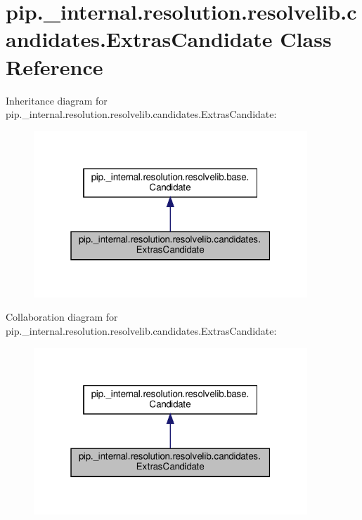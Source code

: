 \hypertarget{classpip_1_1__internal_1_1resolution_1_1resolvelib_1_1candidates_1_1ExtrasCandidate}{}\section{pip.\+\_\+internal.\+resolution.\+resolvelib.\+candidates.\+Extras\+Candidate Class Reference}
\label{classpip_1_1__internal_1_1resolution_1_1resolvelib_1_1candidates_1_1ExtrasCandidate}


Inheritance diagram for pip.\+\_\+internal.\+resolution.\+resolvelib.\+candidates.\+Extras\+Candidate\+:
\nopagebreak
\begin{figure}[H]
\begin{center}
\leavevmode
\includegraphics[width=292pt]{classpip_1_1__internal_1_1resolution_1_1resolvelib_1_1candidates_1_1ExtrasCandidate__inherit__graph}
\end{center}
\end{figure}


Collaboration diagram for pip.\+\_\+internal.\+resolution.\+resolvelib.\+candidates.\+Extras\+Candidate\+:
\nopagebreak
\begin{figure}[H]
\begin{center}
\leavevmode
\includegraphics[width=292pt]{classpip_1_1__internal_1_1resolution_1_1resolvelib_1_1candidates_1_1ExtrasCandidate__coll__graph}
\end{center}
\end{figure}
